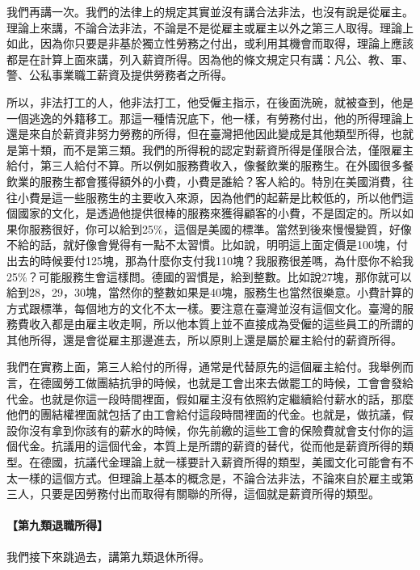 \documentclass[oneside,sub3section]{ctexbook}
\let\oldparagraph\paragraph
\renewcommand{\paragraph}[1]{\oldparagraph{#1}\mbox{}}
\begin{document}
我們再講一次。我們的法律上的規定其實並沒有講合法非法，也沒有說是從雇主。理論上來講，不論合法非法，不論是不是從雇主或雇主以外之第三人取得。理論上如此，因為你只要是非基於獨立性勞務之付出，或利用其機會而取得，理論上應該都是在計算上面來講，列入薪資所得。因為他的條文規定只有講：凡公、教、軍、警、公私事業職工薪資及提供勞務者之所得。

所以，非法打工的人，他非法打工，他受僱主指示，在後面洗碗，就被查到，他是一個逃逸的外籍移工。那這一種情況底下，他一樣，有勞務付出，他的所得理論上還是來自於薪資非努力勞務的所得，但在臺灣把他因此變成是其他類型所得，也就是第十類，而不是第三類。我們的所得稅的認定對薪資所得是僅限合法，僅限雇主給付，第三人給付不算。所以例如服務費收入，像餐飲業的服務生。在外國很多餐飲業的服務生都會獲得額外的小費，小費是誰給？客人給的。特別在美國消費，往往小費是這一些服務生的主要收入來源，因為他們的起薪是比較低的，所以他們這個國家的文化，是透過他提供很棒的服務來獲得顧客的小費，不是固定的。所以如果你服務很好，你可以給到25\%，這個是美國的標準。當然到後來慢慢變質，好像不給的話，就好像會覺得有一點不太習慣。比如說，明明這上面定價是100塊，付出去的時候要付125塊，那為什麼你支付我110塊？我服務很差嗎，為什麼你不給我25\%？可能服務生會這樣問。德國的習慣是，給到整數。比如說27塊，那你就可以給到28，29，30塊，當然你的整數如果是40塊，服務生也當然很樂意。小費計算的方式跟標準，每個地方的文化不太一樣。要注意在臺灣並沒有這個文化。臺灣的服務費收入都是由雇主收走啊，所以他本質上並不直接成為受僱的這些員工的所謂的其他所得，還是會從雇主那邊進去，所以原則上還是屬於雇主給付的薪資所得。

我們在實務上面，第三人給付的所得，通常是代替原先的這個雇主給付。我舉例而言，在德國勞工做團結抗爭的時候，也就是工會出來去做罷工的時候，工會會發給代金。也就是你這一段時間裡面，假如雇主沒有依照約定繼續給付薪水的話，那麼他們的團結權裡面就包括了由工會給付這段時間裡面的代金。也就是，做抗議，假設你沒有拿到你該有的薪水的時候，你先前繳的這些工會的保險費就會支付你的這個代金。抗議用的這個代金，本質上是所謂的薪資的替代，從而他是薪資所得的類型。在德國，抗議代金理論上就一樣要計入薪資所得的類型，美國文化可能會有不太一樣的這個方式。但理論上基本的概念是，不論合法非法，不論來自於雇主或第三人，只要是因勞務付出而取得有關聯的所得，這個就是薪資所得的類型。

\hypertarget{ux7b2cux4e5dux985eux9000ux8077ux6240ux5f97}{%
\paragraph{【第九類退職所得】}\label{ux7b2cux4e5dux985eux9000ux8077ux6240ux5f97}}

我們接下來跳過去，講第九類退休所得。
\end{document}
